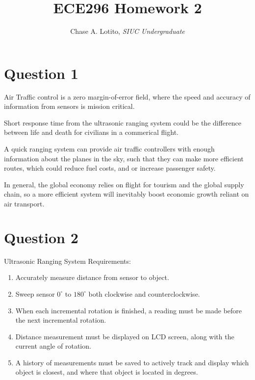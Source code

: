 \documentclass{IEEEtran}
\title{ECE296 Homework 2}
\author{Chase A. Lotito, \textit{SIUC Undergraduate}}
\date{}
\begin{document}
\pagestyle{fancy}

\fancyhead{}

\maketitle %

\section{Question 1}

Air Traffic control is a zero margin-of-error field, where the speed and accuracy of information from sensors is mission critical. 

Short response time from the ultrasonic ranging system could be the difference between life and death for civilians in a commerical flight. 

A quick ranging system can provide air traffic controllers with enough information about the planes in the sky, such that they can make more efficient routes, which could reduce fuel costs, and or increase passenger safety.

In general, the global economy relies on flight for tourism and the global supply chain, so a more efficient system will inevitably boost economic growth reliant on air transport.

\section{Question 2}

Ultrasonic Ranging System Requirements:

\begin{enumerate}
    \item Accurately measure distance from sensor to object.
    \item Sweep sensor \(0^\circ\) to \(180^\circ\) both clockwise and counterclockwise.
    \item When each incremental rotation is finished, a reading must be made before the next incremental rotation.
    \item Distance measurement must be displayed on LCD screen, along with the current angle of rotation.
    \item A history of measurements must be saved to actively track and display which object is closest, and where that object is located in degrees.
\end{enumerate}
\end{document}
